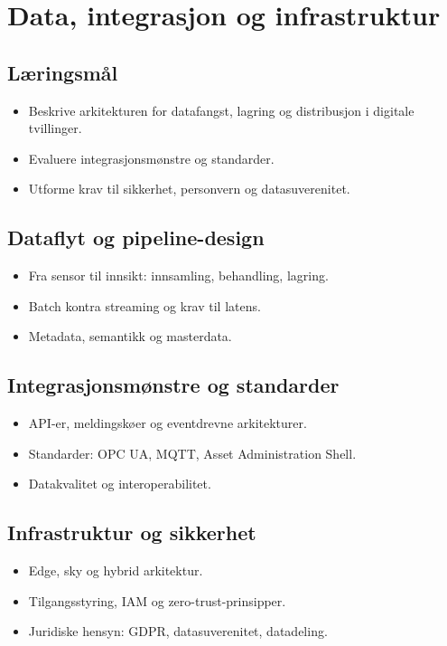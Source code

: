 \chapter{Data, integrasjon og infrastruktur}

\section{Læringsmål}
\begin{itemize}
    \item Beskrive arkitekturen for datafangst, lagring og distribusjon i digitale tvillinger.
    \item Evaluere integrasjonsmønstre og standarder.
    \item Utforme krav til sikkerhet, personvern og datasuverenitet.
\end{itemize}

\section{Dataflyt og pipeline-design}
\begin{itemize}
    \item Fra sensor til innsikt: innsamling, behandling, lagring.
    \item Batch kontra streaming og krav til latens.
    \item Metadata, semantikk og masterdata.
\end{itemize}

\section{Integrasjonsmønstre og standarder}
\begin{itemize}
    \item API-er, meldingskøer og eventdrevne arkitekturer.
    \item Standarder: OPC UA, MQTT, Asset Administration Shell.
    \item Datakvalitet og interoperabilitet.
\end{itemize}

\section{Infrastruktur og sikkerhet}
\begin{itemize}
    \item Edge, sky og hybrid arkitektur.
    \item Tilgangsstyring, IAM og zero-trust-prinsipper.
    \item Juridiske hensyn: GDPR, datasuverenitet, datadeling.
\end{itemize}

